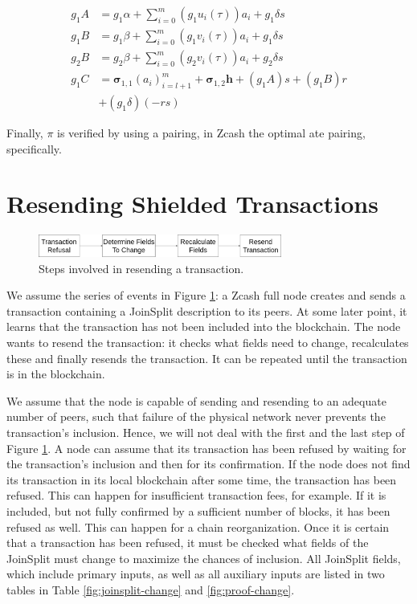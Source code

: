 \documentclass{article}
\begin{document}
\begin{align}
        g_1A &= g_1\alpha + \sum_{i=0}^m {(g_1{u_i(\tau)})}{a_i} + {g_1{\delta}}s \label{eq:gA} \\
        g_1B &= g_1\beta + \sum_{i=0}^m {(g_1{v_i(\tau)})}{a_i} + {g_1{\delta}}s \label{eq:g1B} \\
        g_2B &= g_2\beta + \sum_{i=0}^m {(g_2{v_i(\tau)})}{a_i} + {g_2{\delta}}s \label{eq:g2B} \\
        g_1C &= \boldsymbol\sigma_{1,1}(a_i)_{i=l+1}^m + \boldsymbol\sigma_{1,2}\boldsymbol{h} + {(g_1A)}s + {(g_1B)}r \nonumber \\
        &+ {(g_1\delta)}{(-rs)} \label{eq:gC} 
\end{align}

Finally, $\pi$ is verified by using a pairing, in Zcash the optimal ate pairing\cite{vercauteren:optimal-ate}, specifically.

\section{Resending Shielded Transactions}

\begin{figure}[t]
\includegraphics[width=8cm]{images/timeline.png}
\caption{Steps involved in resending a transaction.} \label{fig:resend-steps}
\centering
\end{figure}

We assume the series of events in Figure \ref{fig:resend-steps}: a Zcash full node creates and sends a transaction containing a JoinSplit description to its peers.
At some later point, it learns that the transaction has not been included into the blockchain.
The node wants to resend the transaction: it checks what fields need to change, recalculates these and finally resends the transaction.
It can be repeated until the transaction is in the blockchain.

We assume that the node is capable of sending and resending to an adequate number of peers, such that failure of the physical network never prevents the transaction's inclusion.
Hence, we will not deal with the first and the last step of Figure \ref{fig:resend-steps}.
A node can assume that its transaction has been refused by waiting for the transaction's inclusion and then for its confirmation.
If the node does not find its transaction in its local blockchain after some time, the transaction has been refused.
This can happen for insufficient transaction fees, for example.
If it is included, but not fully confirmed by a sufficient number of blocks, it has been refused as well.
This can happen for a chain reorganization.
Once it is certain that a transaction has been refused, it must be checked what fields of the JoinSplit must change to maximize the chances of inclusion.
All JoinSplit fields, which include primary inputs, as well as all auxiliary inputs are listed in two tables in Table \ref{fig:joinsplit-change} and \ref{fig:proof-change}.
\end{document}
